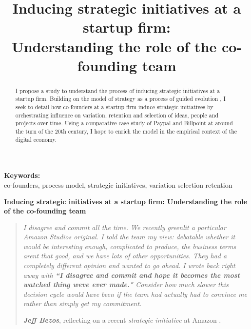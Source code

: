 \documentclass[12pt,letterpaper]{article}
\begin{document}
\title{Inducing strategic initiatives at a startup firm:\\Understanding the role of the co-founding team}
\date{}
\maketitle

\begin{abstract} 
\normalsize I propose a study to understand the process of inducing strategic initiatives at a startup firm. Building on the model of strategy as a process of guided evolution \citep{Lovas2000}, I seek to detail how co-founders at a startup firm induce strategic initiatives by orchestrating influence on variation, retention and selection of ideas, people and projects over time. Using a comparative case study of Paypal and Billpoint at around the turn of the 20th century, I hope to enrich the \cite{Lovas2000} model in the empirical context of the digital economy.
\end{abstract}


{\textbf{Keywords:} \\\indent co-founders, process model, strategic initiatives, variation selection retention}

\newpage
\pagestyle{fancy}
\fancyhf{}
\rhead{\thepage}

\begin{center}
\textbf{Inducing strategic initiatives at a startup firm: Understanding the role of the co-founding team}\vspace{1cm}
\end{center}

\begin{quotation}
\textit{I disagree and commit all the time. We recently greenlit a particular Amazon Studios original. I told the team my view: debatable whether it would be interesting enough, complicated to produce, the business terms aren\textquotesingle t that good, and we have lots of other opportunities. They had a completely different opinion and wanted to go ahead. I wrote back right away with \textbf{``I disagree and commit and hope it becomes the most watched thing we\textquotesingle ve ever made."} Consider how much slower this decision cycle would have been if the team had actually had to convince me rather than simply get my commitment.}\par
\null\hfill \textbf{\textit{Jeff Bezos}}, reflecting on a recent \textit{strategic initiative} at Amazon \citep{Bezos2016}.
\end{quotation}
\end{document}
